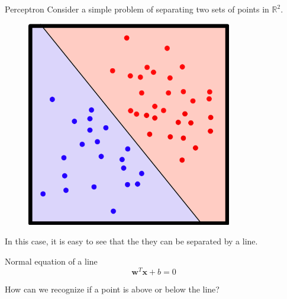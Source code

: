 \documentclass{beamer}
\begin{document}
\begin{frame}{Perceptron}
    Consider a simple problem of separating two sets of points in $\mathbb{R}^2$.

    \vfill

    \begin{minipage}{0.45\textwidth}
        \begin{figure}
            \centering
            \includegraphics[width=0.8\textwidth]{./images/10_separable_points.png}
        \end{figure}
    \end{minipage}
    \begin{minipage}{0.45\textwidth}
        In this case, it is easy to see that the they can be separated by a line.

        \begin{block}{Normal equation of a line}
            $$\boldsymbol{w}^T\boldsymbol{x} + b = 0$$
        \end{block}
    \end{minipage}

    \vfill

    How can we recognize if a point is above or below the line?
\end{frame}
\end{document}
